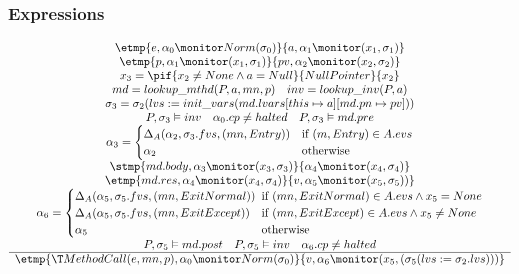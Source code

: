 \subsubsection*{Expressions}
\begin{displaymath}
\begin{array}{c}
\etmp{e, \alpha_0 \monitor Norm(\sigma_0)}{a, \alpha_1 \monitor (x_1, \sigma_1)}\\

\etmp{p, \alpha_1 \monitor (x_1, \sigma_1)}{pv, \alpha_2 \monitor (x_2, \sigma_2)}\\

x_3 = \pif{x_2 \neq None \wedge a = Null}{NullPointer}{x_2}\\

md = lookup\_mthd(P, a, mn, p)\quad inv = lookup\_inv(P, a)\\

\sigma_3 = \sigma_2(lvs:=init\_vars(md.lvars[this \mapsto a][md.pn \mapsto pv]))\\

P, \sigma_3 \vDash inv \quad \alpha_0.cp \neq halted \quad P, \sigma_3 \vDash md.pre\\

\alpha_3 = \begin{cases}
\Delta_A(\alpha_2, \sigma_3.fvs, (mn, Entry))& \text{if } (m, Entry) \in A.evs\\
\alpha_2& \text{otherwise}
\end{cases}\\

\stmp{md.body, \alpha_3 \monitor (x_3, \sigma_3)}{\alpha_4 \monitor (x_4, \sigma_4)}\\

\etmp{md.res, \alpha_4 \monitor (x_4, \sigma_4)}{v, \alpha_5 \monitor (x_5, \sigma_5))}\\

\alpha_6 = \begin{cases}
\Delta_A(\alpha_5, \sigma_5.fvs, (mn, ExitNormal))\!\!\!& \text{if } (mn, ExitNormal) \in A.evs \wedge x_5 =
None\\
\Delta_A(\alpha_5, \sigma_5.fvs, (mn, ExitExcept))& \text{if } (mn, ExitExcept) \in A.evs \wedge x_5 \neq
None\\
\alpha_5& \text{otherwise}
\end{cases}\\

P, \sigma_5 \vDash md.post\quad P, \sigma_5 \vDash inv\quad \alpha_6.cp \neq halted\\

\hline
\etmp{\T MethodCall(e,mn,p), \alpha_0 \monitor Norm(\sigma_0)}{v, \alpha_6 \monitor (x_5,
(\sigma_5(lvs:=\sigma_2.lvs)))}\\
\end{array}\\
\end{displaymath}

